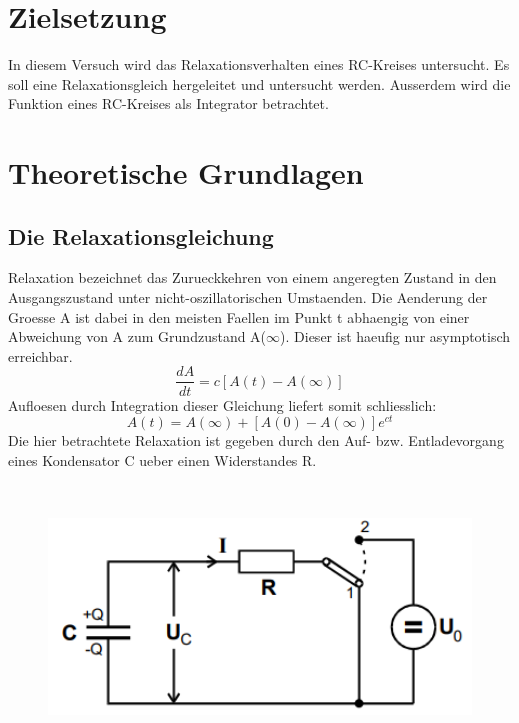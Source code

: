 \section{Zielsetzung}
In diesem Versuch wird das Relaxationsverhalten eines RC-Kreises untersucht. Es soll eine Relaxationsgleich hergeleitet und untersucht werden. Ausserdem wird die Funktion eines RC-Kreises als Integrator betrachtet.
\section{Theoretische Grundlagen}
\subsection{Die Relaxationsgleichung}
Relaxation bezeichnet das Zurueckkehren von einem angeregten Zustand in den Ausgangszustand unter nicht-oszillatorischen Umstaenden. Die Aenderung der Groesse A ist dabei in den meisten Faellen im Punkt t abhaengig von einer Abweichung von A zum Grundzustand A($\infty$). Dieser ist haeufig nur asymptotisch erreichbar.
\begin{equation}
    \frac{dA}{dt}=c[A(t)-A(\infty)]
\end{equation}
Aufloesen durch Integration dieser Gleichung liefert somit schliesslich:
\begin{equation}
    A(t)=A(\infty)+[A(0)-A(\infty)]e^{ct}
\end{equation}
Die hier betrachtete Relaxation ist gegeben durch den Auf- bzw. Entladevorgang eines Kondensator C ueber einen Widerstandes R.
\begin{figure}[H]
    \centering
    \captionsetup{justification=centering}
    \includegraphics[height=7cm]{"Schema_RCKreis.png"}
    \label{Fig:Schema}
\end{figure}
